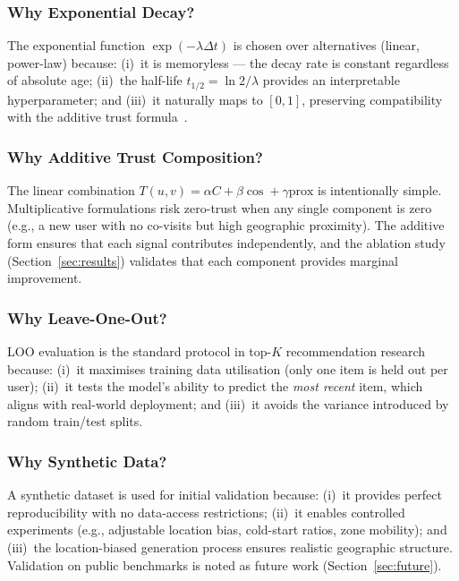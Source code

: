 \documentclass[conference]{IEEEtran}
\begin{document}
\subsubsection{Why Exponential Decay?}
The exponential function $\exp(-\lambda \Delta t)$ is chosen over
alternatives (linear, power-law) because: (i)~it is memoryless --- the
decay rate is constant regardless of absolute age; (ii)~the half-life
$t_{1/2} = \ln 2 / \lambda$ provides an interpretable hyperparameter;
and (iii)~it naturally maps to $[0, 1]$, preserving compatibility with
the additive trust formula~\cite{koren2010collaborative}.

\subsubsection{Why Additive Trust Composition?}
The linear combination $T(u,v) = \alpha C + \beta \cos + \gamma \text{prox}$
is intentionally simple.  Multiplicative formulations risk zero-trust
when any single component is zero (e.g., a new user with no co-visits
but high geographic proximity).  The additive form ensures that each
signal contributes independently, and the ablation study
(Section~\ref{sec:results}) validates that each component provides
marginal improvement.

\subsubsection{Why Leave-One-Out?}
LOO evaluation is the standard protocol in top-$K$ recommendation
research~\cite{he2017neural} because: (i)~it maximises training data
utilisation (only one item is held out per user); (ii)~it tests the
model's ability to predict the \emph{most recent} item, which aligns
with real-world deployment; and (iii)~it avoids the variance introduced
by random train/test splits.

\subsubsection{Why Synthetic Data?}
A synthetic dataset is used for initial validation because: (i)~it
provides perfect reproducibility with no data-access restrictions;
(ii)~it enables controlled experiments (e.g., adjustable location bias,
cold-start ratios, zone mobility); and (iii)~the location-biased
generation process ensures realistic geographic structure.  Validation
on public benchmarks is noted as future work
(Section~\ref{sec:future}).


\end{document}
